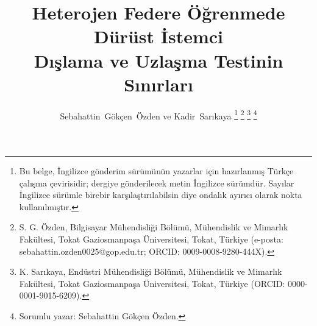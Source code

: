 \documentclass[journal]{IEEEtran}
\begin{document}
\title{Heterojen Federe Öğrenmede Dürüst İstemci\\Dışlama ve Uzlaşma Testinin Sınırları}

\author{Sebahattin~Gökçen~Özden ve Kadir~Sarıkaya%
\thanks{Bu belge, İngilizce gönderim sürümünün yazarlar için hazırlanmış Türkçe çalışma çevirisidir; dergiye gönderilecek metin İngilizce sürümdür. Sayılar İngilizce sürümle birebir karşılaştırılabilsin diye ondalık ayırıcı olarak nokta kullanılmıştır.}%
\thanks{S. G. Özden, Bilgisayar Mühendisliği Bölümü, Mühendislik ve Mimarlık Fakültesi, Tokat Gaziosmanpaşa Üniversitesi, Tokat, Türkiye (e-posta: sebahattin.ozden0025@gop.edu.tr; ORCID: \mbox{0009-0008-9280-444X}).}%
\thanks{K. Sarıkaya, Endüstri Mühendisliği Bölümü, Mühendislik ve Mimarlık Fakültesi, Tokat Gaziosmanpaşa Üniversitesi, Tokat, Türkiye (ORCID: \mbox{0000-0001-9015-6209}).}%
\thanks{Sorumlu yazar: Sebahattin Gökçen Özden.}}

\maketitle
\end{document}
